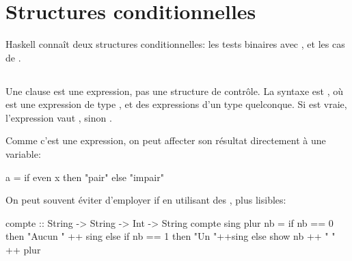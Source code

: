 \section{Structures conditionnelles}
\label{conditionals}

Haskell connaît deux structures conditionnelles: les tests binaires avec , et les cas de .

\subsection{}
\label{if-then-else}

Une clause  est une expression, pas une structure de contrôle.
La syntaxe est , où  est une expression de type ,  et  des expressions d'un type quelconque. Si  est vraie, l'expression vaut , sinon .

Comme c'est une expression, on peut affecter son résultat directement à une variable:

\begin{haskellcode}
a = if even x then "pair" else "impair"
\end{haskellcode}

\begin{infobox}
On peut souvent éviter d'employer if en utilisant des , plus lisibles:

\begin{haskellcode}
compte :: String -> String -> Int -> String
compte sing plur nb = if nb == 0 then "Aucun " ++ sing else if nb == 1 then "Un "++sing else show nb ++ " " ++ plur
\end{haskellcode}

\end{infobox}

\subsection{ }
\label{case}
